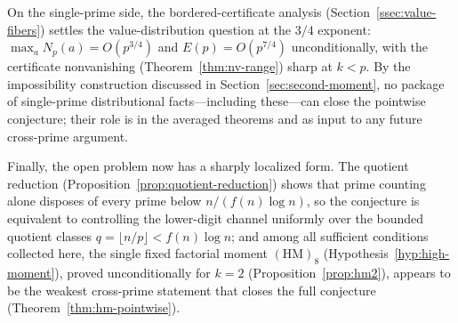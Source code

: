 \documentclass[11pt]{article}
\theoremstyle{definition}
\theoremstyle{remark}
\begin{document}
On the single-prime side, the bordered-certificate
analysis (Section~\ref{ssec:value-fibers}) settles the
value-distribution question at the $3/4$ exponent:
$\max_a N_p(a) = O(p^{3/4})$ and
$E(p) = O(p^{7/4})$ unconditionally, with the
certificate nonvanishing
(Theorem~\ref{thm:nv-range}) sharp at $k < p$.
By the impossibility construction discussed in
Section~\ref{sec:second-moment}, no package of
single-prime distributional facts---including
these---can close the pointwise conjecture; their role
is in the averaged theorems and as input to any future
cross-prime argument.

Finally, the open problem now has a sharply
localized form. The quotient reduction
(Proposition~\ref{prop:quotient-reduction})
shows that prime counting alone disposes of every
prime below $n/(f(n)\log n)$, so the conjecture is
equivalent to controlling the lower-digit channel
uniformly over the bounded quotient classes
$q = \lfloor n/p \rfloor < f(n)\log n$; and among
all sufficient conditions collected here, the
single fixed factorial moment
$(\mathrm{HM})_8$
(Hypothesis~\ref{hyp:high-moment}), proved
unconditionally for $k = 2$
(Proposition~\ref{prop:hm2}), appears to be the
weakest cross-prime statement that closes the
full conjecture
(Theorem~\ref{thm:hm-pointwise}).






\end{document}
